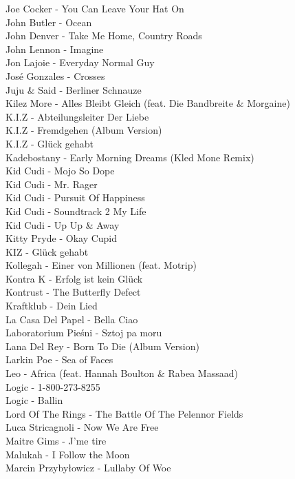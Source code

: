 Joe Cocker - You Can Leave Your Hat On\\
John Butler - Ocean\\
John Denver - Take Me Home, Country Roads\\
John Lennon - Imagine\\
Jon Lajoie - Everyday Normal Guy\\
José Gonzales - Crosses\\
Juju \& Said - Berliner Schnauze\\
Kilez More - Alles Bleibt Gleich (feat. Die Bandbreite \& Morgaine)\\
K.I.Z - Abteilungsleiter Der Liebe\\
K.I.Z - Fremdgehen (Album Version)\\
K.I.Z - Glück gehabt\\
Kadebostany - Early Morning Dreams (Kled Mone Remix)\\
Kid Cudi - Mojo So Dope\\
Kid Cudi - Mr. Rager\\
Kid Cudi - Pursuit Of Happiness\\
Kid Cudi - Soundtrack 2 My Life\\
Kid Cudi - Up Up \& Away\\
Kitty Pryde - Okay Cupid\\
KIZ - Glück gehabt\\
Kollegah - Einer von Millionen (feat. Motrip)\\
Kontra K - Erfolg ist kein Glück\\
Kontrust - The Butterfly Defect\\
Kraftklub - Dein Lied\\
La Casa Del Papel - Bella Ciao\\
Laboratorium Pieśni - Sztoj pa moru\\
Lana Del Rey - Born To Die (Album Version)\\
Larkin Poe - Sea of Faces\\
Leo - Africa (feat. Hannah Boulton \& Rabea Massaad)\\
Logic - 1-800-273-8255\\
Logic - Ballin\\
Lord Of The Rings - The Battle Of The Pelennor Fields\\
Luca Stricagnoli - Now We Are Free\\
Maitre Gims - J'me tire\\
Malukah - I Follow the Moon\\
Marcin Przybyłowicz - Lullaby Of Woe\\

